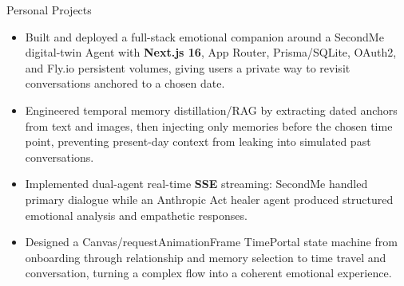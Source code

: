 \documentclass{resume} %
\begin{document}
\begin{workSection}{Personal Projects}
    \customItem[title=Time Machine - Emotional Companion App, keyHighlight=SecondMe digital-twin companion with temporal memory distillation/RAG and dual-agent SSE chat, duration=Jan. 2026 -- Mar. 2026]
    \begin{itemize}
        \vspace{-0.5em}\itemsep -6pt {}
        \item Built and deployed a full-stack emotional companion around a SecondMe digital-twin Agent with \textbf{Next.js 16}, App Router, Prisma/SQLite, OAuth2, and Fly.io persistent volumes, giving users a private way to revisit conversations anchored to a chosen date.
        \item Engineered temporal memory distillation/RAG by extracting dated anchors from text and images, then injecting only memories before the chosen time point, preventing present-day context from leaking into simulated past conversations.
        \item Implemented dual-agent real-time \textbf{SSE} streaming: SecondMe handled primary dialogue while an Anthropic Act healer agent produced structured emotional analysis and empathetic responses.
        \item Designed a Canvas/requestAnimationFrame TimePortal state machine from onboarding through relationship and memory selection to time travel and conversation, turning a complex flow into a coherent emotional experience.
    \end{itemize}


\end{workSection}
\end{document}
